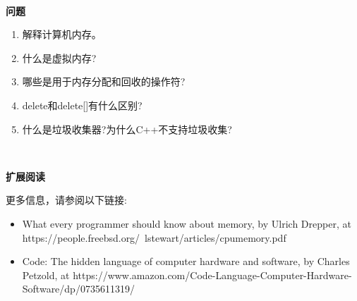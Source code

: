 \noindent\textbf{}\ \par
\textbf{问题} \ \par
\begin{enumerate}
	\item 解释计算机内存。
	\item 什么是虚拟内存?
	\item 哪些是用于内存分配和回收的操作符?
	\item delete和delete[]有什么区别?
	\item 什么是垃圾收集器?为什么C++不支持垃圾收集?
\end{enumerate}

\noindent\textbf{}\ \par
\textbf{扩展阅读} \ \par
更多信息，请参阅以下链接: \par

\begin{itemize}
	\item What every programmer should know about memory, by Ulrich Drepper, at  https:/​/​people.​freebsd.​org/​~lstewart/​articles/​cpumemory.​pdf
	\item Code: The hidden language of computer hardware and software, by Charles Petzold, at  https:/​/​www.​amazon.​com/​Code-​Language-​Computer-​Hardware-	Software/​dp/​0735611319/​
\end{itemize}

\newpage



